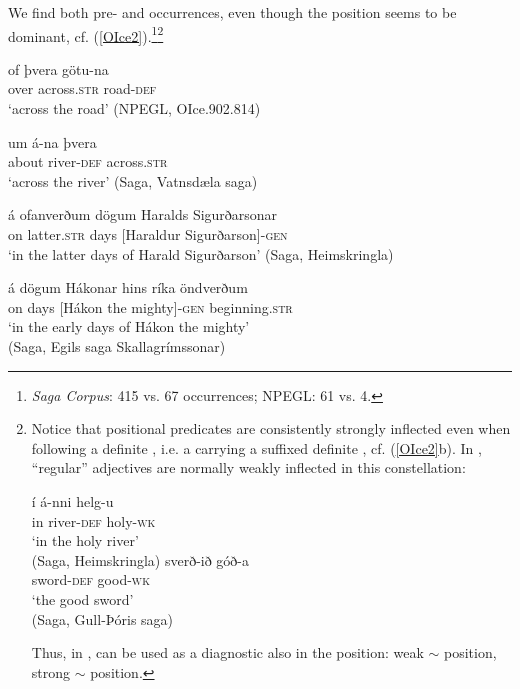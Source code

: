 \documentclass[output=paper,colorlinks,citecolor=brown]{langscibook}
\begin{document}
We find both pre- and  occurrences, even though the  position seems to be dominant, cf. (\ref{OIce2}).\footnote{\textit{Saga Corpus}: 415  vs. 67  occurrences; NPEGL: 61 vs. 4.}\footnote{Notice
  that positional predicates are consistently strongly inflected even when following a definite , i.e. a  carrying a suffixed definite , cf. (\ref{OIce2}b). In , ``regular''  adjectives are normally weakly inflected in this constellation:

  \begin{multicols}{2}{
  \begin{exe}
    \ex
    \begin{xlist}
      \ex\gll í á-nni helg-u \\
        in river-\textsc{def} holy-\textsc{wk} \\
        \glt  `in the holy river' \\ (Saga, Heimskringla)
      \ex\gll sverð-ið góð-a \\
        sword-\textsc{def} good-\textsc{wk} \\
        \glt  `the good sword' \\ (Saga, Gull-Þóris saga)
    \end{xlist}
  \end{exe}}
  \end{multicols}
  Thus, in ,  can be used as a diagnostic also in the  position: weak  $\sim$  position, strong  $\sim$  position.
}


\begin{exe}
   \ex \label{OIce2}  
    \begin{xlist}
      \ex \gll   of þvera  götu-na     \\
        over across.\textsc{str}  road-\textsc{def}  \\ 
         \glt `across the road' (NPEGL, OIce.902.814)

      \ex \gll   um á-na  þvera     \\
        about  river-\textsc{def}  across.\textsc{str}  \\ 
        \glt `across the river' (Saga, Vatnsdæla saga)

       \ex \gll  á ofanverðum dögum {\phantom{[}Haralds Sigurðarsonar}   \\  
          on latter.\textsc{str} days  {[Haraldur Sigurðarson]-\textsc{gen} }   \\ 
          \glt  `in the latter days of Harald Sigurðarson' 
          (Saga, Heimskringla)

      \ex \gll  á dögum {\phantom{[}Hákonar {hins ríka}}  öndverðum   \\   
        on days  {[Hákon the mighty]-\textsc{gen}} beginning.\textsc{str}  \\
            \glt `in the early days of {H\'akon} the mighty' \\(Saga, Egils saga Skallagrímssonar)
    \end{xlist}
\end{exe} 
\end{document}
